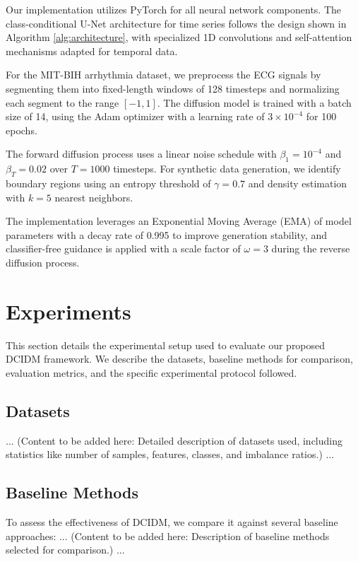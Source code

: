 \documentclass{article}
\begin{document}
Our implementation utilizes PyTorch for all neural network components. The class-conditional U-Net architecture for time series follows the design shown in Algorithm \ref{alg:architecture}, with specialized 1D convolutions and self-attention mechanisms adapted for temporal data.

For the MIT-BIH arrhythmia dataset, we preprocess the ECG signals by segmenting them into fixed-length windows of 128 timesteps and normalizing each segment to the range $[-1, 1]$. The diffusion model is trained with a batch size of 14, using the Adam optimizer with a learning rate of $3 \times 10^{-4}$ for 100 epochs.

The forward diffusion process uses a linear noise schedule with $\beta_1 = 10^{-4}$ and $\beta_T = 0.02$ over $T=1000$ timesteps. For synthetic data generation, we identify boundary regions using an entropy threshold of $\gamma = 0.7$ and density estimation with $k=5$ nearest neighbors.

The implementation leverages an Exponential Moving Average (EMA) of model parameters with a decay rate of 0.995 to improve generation stability, and classifier-free guidance is applied with a scale factor of $\omega=3$ during the reverse diffusion process.

\section{Experiments}
This section details the experimental setup used to evaluate our proposed DCIDM framework. We describe the datasets, baseline methods for comparison, evaluation metrics, and the specific experimental protocol followed.

\subsection{Datasets}
... (Content to be added here: Detailed description of datasets used, including statistics like number of samples, features, classes, and imbalance ratios.) ...

\subsection{Baseline Methods}
To assess the effectiveness of DCIDM, we compare it against several baseline approaches:
... (Content to be added here: Description of baseline methods selected for comparison.) ...
\end{document}
